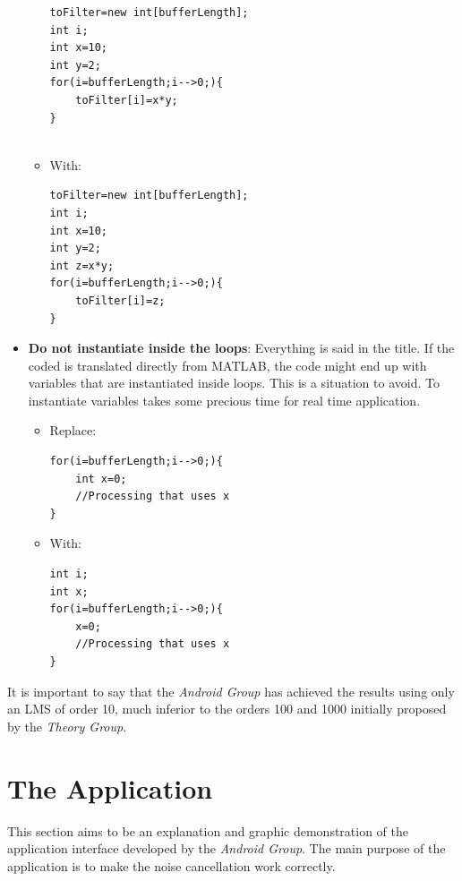 \documentclass[11pt,a4paper,english]{book}  %
\theoremstyle{definition}  %
\theoremstyle{plain}  %
\theoremstyle{remark}  %
\begin{document}
\begin{itemize}
\begin{itemize}
\begin{lstlisting}
toFilter=new int[bufferLength];
int i;
int x=10;
int y=2;
for(i=bufferLength;i-->0;){
	toFilter[i]=x*y;
}
	
\end{lstlisting}
		
		\item With:
		
\begin{lstlisting}
toFilter=new int[bufferLength];
int i;
int x=10;
int y=2;
int z=x*y;
for(i=bufferLength;i-->0;){
	toFilter[i]=z;
}

\end{lstlisting}

	\end{itemize}
	
	\item \textbf{Do not instantiate inside the loops}: Everything is said in the title. If the coded is translated directly from MATLAB, the code might end up with variables that are instantiated inside loops. This is a situation to avoid. To instantiate variables takes some precious time for real time application.
	
	\begin{itemize}
	\item Replace:
\begin{lstlisting}
for(i=bufferLength;i-->0;){
	int x=0;
	//Processing that uses x
}

\end{lstlisting}

	\item With:
	
\begin{lstlisting}
int i;
int x;
for(i=bufferLength;i-->0;){
	x=0;
	//Processing that uses x
}

\end{lstlisting}
		\end{itemize}

	
		\end{itemize}
	
	It is important to say that the \textit{Android Group} has achieved the results using only an LMS of order 10, much inferior to the orders 100 and 1000 initially proposed by the \textit{Theory Group}.

	
	\section{The Application}
	
	This section aims to be an explanation and graphic demonstration of the application interface developed by the \textit{Android Group}. The main purpose of the application is to make the noise cancellation work correctly.
	
\end{document}
